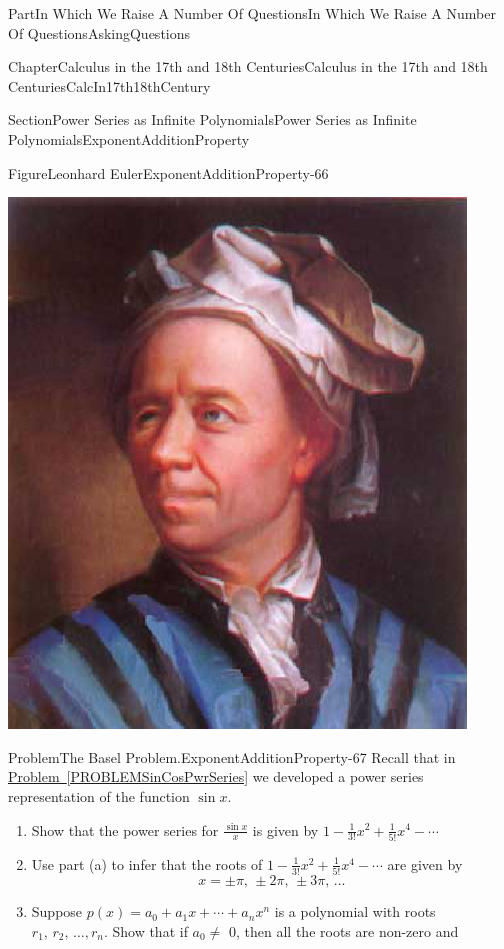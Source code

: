 \documentclass[oneside,10pt,]{book}
\newcommand{\xreffont}{\relax}
\numberwithin{equation}{part}
\begin{document}
\begin{partptx}{Part}{In Which We Raise A Number Of Questions}{}{In Which We Raise A Number Of Questions}{}{}{AskingQuestions}
\begin{chapterptx}{Chapter}{Calculus in the 17th and 18th Centuries}{}{Calculus in the 17th and 18th Centuries}{}{}{CalcIn17th18thCentury}
\begin{sectionptx}{Section}{Power Series as Infinite Polynomials}{}{Power Series as Infinite Polynomials}{}{}{ExponentAdditionProperty}
\begin{figureptx}{Figure}{Leonhard Euler}{ExponentAdditionProperty-66}{}
\begin{image}{0.325}{0.35}{0.325}{}
\includegraphics[width=\linewidth]{external/images/Euler.png}
\end{image}%
\tcblower
\end{figureptx}%
\begin{problem}{Problem}{The Basel Problem.}{ExponentAdditionProperty-67}%
Recall that in \hyperref[PROBLEMSinCosPwrSeries]{Problem~{\xreffont\ref{PROBLEMSinCosPwrSeries}}} we developed a power series representation of the function  \(\sin x\).%
\begin{enumerate}[font=\bfseries,label=(\alph*),ref=\alph*]%
\item{}Show that the power series for \(\frac{\sin x}{x}\) is given by \(1-\frac{1}{3!}x^2+\frac{1}{5!}x^4-\cdots\)%
\item{}Use part (a) to infer that the roots of \(1-\frac{1}{3!}x^2+\frac{1}{5!}x^4-\cdots\) are given by%
\begin{equation*}
x=\pm\pi,\,\pm 2\pi,\,\pm 3\pi,\,\ldots
\end{equation*}
%
\item{}Suppose \(p(x)=a_0+a_1x+\cdots+a_nx^n\) is a polynomial with roots \(r_1,\,r_2,\,\ldots,r_n\). Show that if \(a_0\neq\) \(0\), then all the roots are non-zero and%

\end{enumerate}
\end{problem}
\end{sectionptx}
\end{chapterptx}
\end{partptx}
\end{document}
